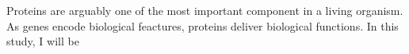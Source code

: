 Proteins are arguably one of the most important component in a living organism. As genes encode biological feactures, proteins deliver biological functions.   In this study, I will be 